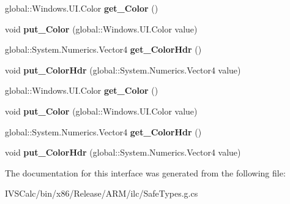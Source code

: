\begin{DoxyCompactItemize}
global\+::\+Windows.\+U\+I.\+Color {\bfseries get\+\_\+\+Color} ()
\item 
\mbox{\label{interface_microsoft_1_1_graphics_1_1_canvas_1_1_brushes_1_1_i_canvas_solid_color_brush_aa8d3a56d21366e988cf66c329e0eb2f9}} 
void {\bfseries put\+\_\+\+Color} (global\+::\+Windows.\+U\+I.\+Color value)
\item 
\mbox{\label{interface_microsoft_1_1_graphics_1_1_canvas_1_1_brushes_1_1_i_canvas_solid_color_brush_ac68c4c2b0bdd24faefa2f8ff6fb4ce8d}} 
global\+::\+System.\+Numerics.\+Vector4 {\bfseries get\+\_\+\+Color\+Hdr} ()
\item 
\mbox{\label{interface_microsoft_1_1_graphics_1_1_canvas_1_1_brushes_1_1_i_canvas_solid_color_brush_a46fd94b1a80ec1ddd669b99226b563f8}} 
void {\bfseries put\+\_\+\+Color\+Hdr} (global\+::\+System.\+Numerics.\+Vector4 value)
\item 
\mbox{\label{interface_microsoft_1_1_graphics_1_1_canvas_1_1_brushes_1_1_i_canvas_solid_color_brush_a11fffcf147ca0cd150020040401ddb5e}} 
global\+::\+Windows.\+U\+I.\+Color {\bfseries get\+\_\+\+Color} ()
\item 
\mbox{\label{interface_microsoft_1_1_graphics_1_1_canvas_1_1_brushes_1_1_i_canvas_solid_color_brush_aa8d3a56d21366e988cf66c329e0eb2f9}} 
void {\bfseries put\+\_\+\+Color} (global\+::\+Windows.\+U\+I.\+Color value)
\item 
\mbox{\label{interface_microsoft_1_1_graphics_1_1_canvas_1_1_brushes_1_1_i_canvas_solid_color_brush_ac68c4c2b0bdd24faefa2f8ff6fb4ce8d}} 
global\+::\+System.\+Numerics.\+Vector4 {\bfseries get\+\_\+\+Color\+Hdr} ()
\item 
\mbox{\label{interface_microsoft_1_1_graphics_1_1_canvas_1_1_brushes_1_1_i_canvas_solid_color_brush_a46fd94b1a80ec1ddd669b99226b563f8}} 
void {\bfseries put\+\_\+\+Color\+Hdr} (global\+::\+System.\+Numerics.\+Vector4 value)
\end{DoxyCompactItemize}


The documentation for this interface was generated from the following file\+:\begin{DoxyCompactItemize}
\item 
I\+V\+S\+Calc/bin/x86/\+Release/\+A\+R\+M/ilc/Safe\+Types.\+g.\+cs\end{DoxyCompactItemize}

